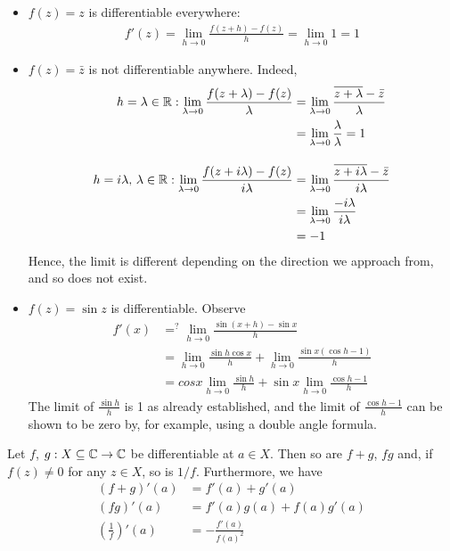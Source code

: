 \documentclass{../template/note}
\begin{document}
    \begin{example*}
        \begin{itemize}
            \item \(f(z) = z\) is differentiable everywhere:
            \begin{align*}
                f'(z) = \lim_{h \to 0} \frac{f(z+h)-f(z)}{h} = \lim_{h \to 0} 1 = 1
            \end{align*}
            \item \(f(z) = \bar z\) is not differentiable anywhere. Indeed,
            \begin{align*}
                h = \lambda \in \mathbb R: \lim_{\lambda \to 0} \frac{f(z+\lambda)-f(z)}{\lambda} &= \lim_{\lambda \to 0} \frac{\overline{z+\lambda}-\bar z}{\lambda} \\
                &= \lim_{\lambda \to 0} \frac{\lambda}{\lambda} = 1 \\[10pt]
                h = i\lambda, \, \lambda \in \mathbb R: \lim_{\lambda \to 0} \frac{f(z+i\lambda)-f(z)}{i\lambda} &= \lim_{\lambda \to 0} \frac{\overline{z+i\lambda}-\bar z}{i\lambda} \\
                &= \lim_{\lambda \to 0} \frac{-i\lambda}{i\lambda} \\
                &= -1
            \end{align*}
            Hence, the limit is different depending on the direction we approach from, and so does not exist.
            \item \(f(z) = \sin z\) is differentiable. Observe
            \begin{align*}
                f'(x) &=^? \lim_{h \to 0} \frac{\sin(x+h)-\sin x}{h} \\
                &= \lim_{h \to 0} \frac{\sin h \cos x}{h} + \lim_{h \to 0} \frac{\sin x(\cos h-1)}{h} \\ 
                &= cos x \lim_{h \to 0} \frac{\sin h}{h} + \sin x \lim_{h \to 0} \frac{\cos h - 1}{h}
            \end{align*}
            The limit of \(\frac{\sin h}{h}\) is 1 as already established, and the limit of \(\frac{\cos h-1}{h}\) can be shown to be zero by, for example, using a double angle formula.  
        \end{itemize}
    \end{example*}

    \begin{lemma}
        Let \(f\), \(g: X \subseteq \mathbb C \to \mathbb C\) be differentiable at \(a \in X\). Then so are \(f+g\), \(fg\) and, if \(f(z) \neq 0\) for any \(z \in X\), so is \(1/f\). Furthermore, we have
        \begin{align*}
            (f+g)'(a) &= f'(a) + g'(a) \\
            (fg)'(a) &= f'(a)g(a) + f(a)g'(a) \\
            \left(\frac 1 f\right)'(a) &= -\frac{f'(a)}{f(a)^2}
        \end{align*}
    \end{lemma}
    
\end{document}
